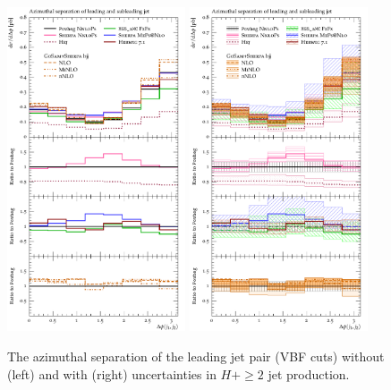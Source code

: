 
\begin{figure}[t!]
  \centering
  \includegraphics[width=0.47\textwidth]{figures/hjetscomp_u_deltaphi_jj_VBF.pdf}
  \hfill
  \includegraphics[width=0.47\textwidth]{figures/hjetscomp_deltaphi_jj_VBF.pdf}
  \caption{
    The azimuthal separation of the leading jet pair (VBF cuts) without (left) and 
    with (right) uncertainties in $H+\ge2$ jet
    production.
    \label{fig:hjetscomp:results:VBFobs:dphijj}
  }
\end{figure}

